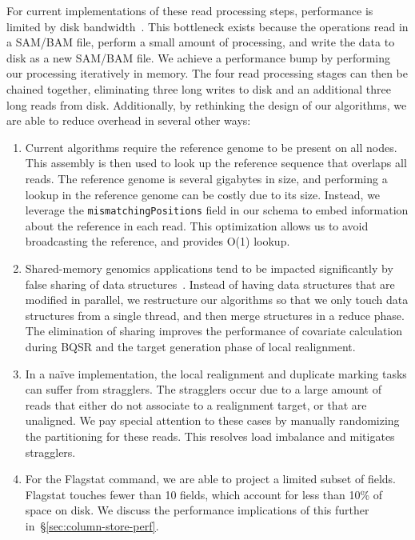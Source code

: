 \documentclass[masters]{ucbthesis}
\begin{document}
For current implementations of these read processing steps, performance is limited by disk
bandwidth~\cite{diao15}. This bottleneck exists because the operations read in a SAM/BAM file, perform
a small amount of processing, and write the data to disk as a new SAM/BAM file. We achieve a
performance bump by performing our processing iteratively in memory. The four read processing stages
can then be chained together, eliminating three long writes to disk and an additional three long reads
from disk. Additionally, by rethinking the design of our algorithms, we are able to reduce overhead in
several other ways:

\begin{enumerate}
\item Current algorithms require the reference genome to be present on all nodes. This assembly is then
used to look up the reference sequence that overlaps all reads. The reference genome is several
gigabytes in size, and performing a lookup in the reference genome can be costly due to its size. Instead,
we leverage the \texttt{mismatchingPositions} field in our schema to embed information about the
reference in each read. This optimization allows us to avoid broadcasting the reference, and provides
O(1) lookup.
\item Shared-memory genomics applications tend to be impacted significantly by false sharing of data
structures~\cite{zaharia11}. Instead of having data structures that are modified in parallel, we
restructure our algorithms so that we only touch data structures from a single thread, and then merge
structures in a reduce phase. The elimination of sharing improves the performance of covariate
calculation during BQSR and the target generation phase of local realignment.
\item In a na\"{i}ve implementation, the local realignment and duplicate marking tasks can suffer from
stragglers. The stragglers occur due to a large amount of reads that either do not associate to a
realignment target, or that are unaligned. We pay special attention to these cases by manually
randomizing the partitioning for these reads. This resolves load imbalance and mitigates stragglers.
\item For the Flagstat command, we are able to project a limited subset of fields. Flagstat touches fewer
than 10 fields, which account for less than 10\% of space on disk. We discuss the performance
implications of this further in~\S\ref{sec:column-store-perf}.
\end{enumerate}
\end{document}
